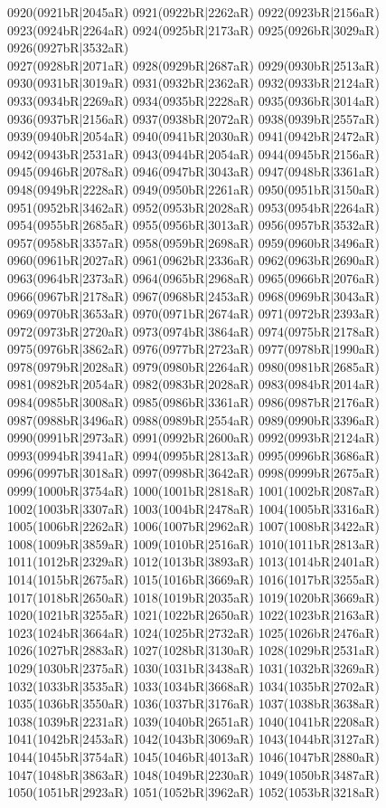 0920(0921bR|2045aR) 0921(0922bR|2262aR) 0922(0923bR|2156aR) 0923(0924bR|2264aR) 0924(0925bR|2173aR) 0925(0926bR|3029aR) 0926(0927bR|3532aR) \\0927(0928bR|2071aR) 0928(0929bR|2687aR) 0929(0930bR|2513aR) 0930(0931bR|3019aR) 0931(0932bR|2362aR) 0932(0933bR|2124aR) 0933(0934bR|2269aR) 0934(0935bR|2228aR) 0935(0936bR|3014aR) \\0936(0937bR|2156aR) 0937(0938bR|2072aR) 0938(0939bR|2557aR) 0939(0940bR|2054aR) 0940(0941bR|2030aR) 0941(0942bR|2472aR) 0942(0943bR|2531aR) 0943(0944bR|2054aR) 0944(0945bR|2156aR) \\0945(0946bR|2078aR) 0946(0947bR|3043aR) 0947(0948bR|3361aR) 0948(0949bR|2228aR) 0949(0950bR|2261aR) 0950(0951bR|3150aR) 0951(0952bR|3462aR) 0952(0953bR|2028aR) 0953(0954bR|2264aR) \\0954(0955bR|2685aR) 0955(0956bR|3013aR) 0956(0957bR|3532aR) 0957(0958bR|3357aR) 0958(0959bR|2698aR) 0959(0960bR|3496aR) 0960(0961bR|2027aR) 0961(0962bR|2336aR) 0962(0963bR|2690aR) \\0963(0964bR|2373aR) 0964(0965bR|2968aR) 0965(0966bR|2076aR) 0966(0967bR|2178aR) 0967(0968bR|2453aR) 0968(0969bR|3043aR) 0969(0970bR|3653aR) 0970(0971bR|2674aR) 0971(0972bR|2393aR) \\0972(0973bR|2720aR) 0973(0974bR|3864aR) 0974(0975bR|2178aR) 0975(0976bR|3862aR) 0976(0977bR|2723aR) 0977(0978bR|1990aR) 0978(0979bR|2028aR) 0979(0980bR|2264aR) 0980(0981bR|2685aR) \\0981(0982bR|2054aR) 0982(0983bR|2028aR) 0983(0984bR|2014aR) 0984(0985bR|3008aR) 0985(0986bR|3361aR) 0986(0987bR|2176aR) 0987(0988bR|3496aR) 0988(0989bR|2554aR) 0989(0990bR|3396aR) \\0990(0991bR|2973aR) 0991(0992bR|2600aR) 0992(0993bR|2124aR) 0993(0994bR|3941aR) 0994(0995bR|2813aR) 0995(0996bR|3686aR) 0996(0997bR|3018aR) 0997(0998bR|3642aR) 0998(0999bR|2675aR) \\0999(1000bR|3754aR) 1000(1001bR|2818aR) 1001(1002bR|2087aR) 1002(1003bR|3307aR) 1003(1004bR|2478aR) 1004(1005bR|3316aR) 1005(1006bR|2262aR) 1006(1007bR|2962aR) 1007(1008bR|3422aR) \\1008(1009bR|3859aR) 1009(1010bR|2516aR) 1010(1011bR|2813aR) 1011(1012bR|2329aR) 1012(1013bR|3893aR) 1013(1014bR|2401aR) 1014(1015bR|2675aR) 1015(1016bR|3669aR) 1016(1017bR|3255aR) \\1017(1018bR|2650aR) 1018(1019bR|2035aR) 1019(1020bR|3669aR) 1020(1021bR|3255aR) 1021(1022bR|2650aR) 1022(1023bR|2163aR) 1023(1024bR|3664aR) 1024(1025bR|2732aR) 1025(1026bR|2476aR) \\1026(1027bR|2883aR) 1027(1028bR|3130aR) 1028(1029bR|2531aR) 1029(1030bR|2375aR) 1030(1031bR|3438aR) 1031(1032bR|3269aR) 1032(1033bR|3535aR) 1033(1034bR|3668aR) 1034(1035bR|2702aR) \\1035(1036bR|3550aR) 1036(1037bR|3176aR) 1037(1038bR|3638aR) 1038(1039bR|2231aR) 1039(1040bR|2651aR) 1040(1041bR|2208aR) 1041(1042bR|2453aR) 1042(1043bR|3069aR) 1043(1044bR|3127aR) \\1044(1045bR|3754aR) 1045(1046bR|4013aR) 1046(1047bR|2880aR) 1047(1048bR|3863aR) 1048(1049bR|2230aR) 1049(1050bR|3487aR) 1050(1051bR|2923aR) 1051(1052bR|3962aR) 1052(1053bR|3218aR) 